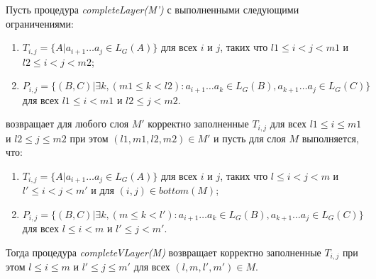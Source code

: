 \begin{lemma}
Пусть процедура \textit{completeLayer(M')} с выполненными следующими ограничениями:
\begin{enumerate}
  \item $T_{i, j} = \{ A |  a_{i + 1} \dots a_{j} \in L_G(A)\}$ для всех $i$ и $j$, таких что $l1 \leq i < j < m1$ и $l2 \leq i < j < m2$;
  \item $P_{i, j} =  \{ (B, C) |\exists k, (m1 \le k < l2): a_{i + 1} \dots a_{k} \in L_G(B), a_{k + 1} \dots a_{j} \in L_G(C)\}$ для всех $l1 \leq i < m1$ и $l2 \leq j < m2$.
\end{enumerate}
возвращает для любого слоя $M'$ корректно заполненные $T_{i, j}$ для всех $l1 \leq i \le m1$ и $l2 \leq j \le m2$ при этом $(l1, m1, l2, m2) \in M'$
и пусть для слоя $M$ выполняется, что:
\begin{enumerate}
  \item $T_{i, j} = \{ A |  a_{i + 1} \dots a_{j} \in L_G(A)\}$ для всех $i$ и $j$, таких что $l \leq i < j < m$ и $l' \leq i < j < m'$ и для $(i, j) \in bottom(M)$;
  \item $P_{i, j} =  \{ (B, C) |\exists k, (m \le k < l'): a_{i + 1} \dots a_{k} \in L_G(B), a_{k + 1} \dots a_{j} \in L_G(C)\}$ для всех $l \leq i < m$ и $l' \leq j < m'$.
\end{enumerate}

Тогда процедура \textit{completeVLayer(M)} возвращает корректно заполненные $T_{i, j}$ при этом $l \leq i \le m$ и $l' \leq j \le m'$ для всех $(l, m, l', m') \in M$.
\end{lemma}

